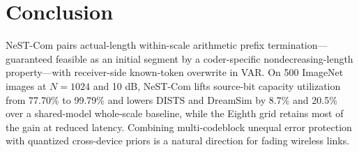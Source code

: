 \section{Conclusion}
NeST-Com pairs actual-length within-scale arithmetic prefix termination---guaranteed feasible as an initial segment by a coder-specific nondecreasing-length property---with receiver-side known-token overwrite in VAR. On 500 ImageNet images at $N=1024$ and 10 dB, NeST-Com lifts source-bit capacity utilization from 77.70\% to 99.79\% and lowers DISTS and DreamSim by 8.7\% and 20.5\% over a shared-model whole-scale baseline, while the Eighth grid retains most of the gain at reduced latency. Combining multi-codeblock unequal error protection with quantized cross-device priors is a natural direction for fading wireless links.
